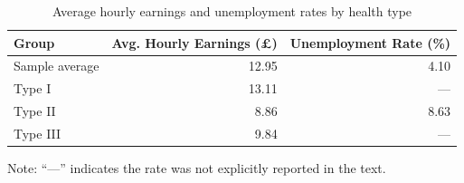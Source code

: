 \begin{table}[ht]
    \centering
    \caption{Average hourly earnings and unemployment rates by health type}
    \label{tab:earnings}
    \begin{tabular}{lrr}
        \toprule
        Group & Avg. Hourly Earnings (\pounds) & Unemployment Rate (\%) \\
        \midrule
        Sample average & 12.95 & 4.10 \\
        Type I & 13.11 & --- \\
        Type II & 8.86 & 8.63 \\
        Type III & 9.84 & --- \\
        \bottomrule
    \end{tabular}
    \begin{flushleft}
    \footnotesize Note: ``---'' indicates the rate was not explicitly reported in the text.
    \end{flushleft}
\end{table}
